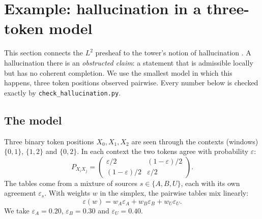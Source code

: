 \documentclass[11pt]{article}
\theoremstyle{definition}
\begin{document}
\section{Example: hallucination in a three-token model}\label{sec:halluc}
This section connects the $L^2$ presheaf to the tower's notion of hallucination \cite[\S10.5]{Tower}. A hallucination there is an
\emph{obstructed claim}: a statement that is admissible locally but has no coherent completion. We use the smallest model in which this
happens, three token positions observed pairwise. Every number below is checked exactly by \texttt{check\_hallucination.py}.

\subsection{The model}
Three binary token positions $X_0,X_1,X_2$ are seen through the contexts (windows) $\{0,1\}$, $\{1,2\}$ and $\{0,2\}$. In each context
the two tokens agree with probability $\varepsilon$:
\[
P_{X_iX_j}=\begin{pmatrix}\varepsilon/2&(1-\varepsilon)/2\\(1-\varepsilon)/2&\varepsilon/2\end{pmatrix}.
\]
The tables come from a mixture of sources $s\in\{A,B,U\}$, each with its own agreement $\varepsilon_s$. With weights $w$ in the simplex,
the pairwise tables mix linearly:
\[
\varepsilon(w)=w_A\varepsilon_A+w_B\varepsilon_B+w_U\varepsilon_U .
\]
We take $\varepsilon_A=0.20$, $\varepsilon_B=0.30$ and $\varepsilon_U=0.40$.
\end{document}
